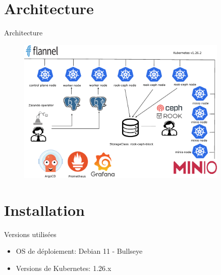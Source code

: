 \section{Architecture}


\begin{frame}[fragile]{Architecture}

\begin{figure}
\begin{center}
\includegraphics[width=0.9\textwidth, height=0.9\textheight]{images/architecture.eps}
\end{center}
\end{figure}

\end{frame}


\section{Installation}


\begin{frame}[fragile]{Versions utilisées}

   \begin{itemize}
      \item OS de déploiement: Debian 11 - Bullseye
      \item Versions de Kubernetes: 1.26.x
   \end{itemize}

\end{frame}

